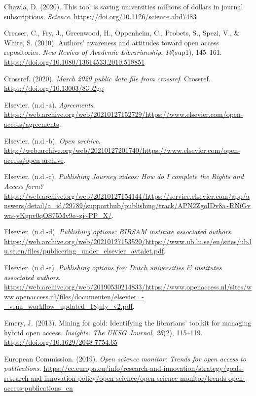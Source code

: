 \documentclass[a4paper,man,floatsintext,longtable,noextraspace,12pt]{apa6}
\newlength{\cslhangindent}
\newenvironment{cslreferences}%
  {\setlength{\parindent}{0pt}%
  \everypar{\setlength{\hangindent}{\cslhangindent}}\ignorespaces}%
  {\par}
\begin{document}
\begin{cslreferences}
\leavevmode\hypertarget{ref-Chawla_2020}{}%
Chawla, D. (2020). This tool is saving universities millions of dollars
in journal subscriptions. \emph{Science}.
\url{https://doi.org/10.1126/science.abd7483}

\leavevmode\hypertarget{ref-Creaser_2010}{}%
Creaser, C., Fry, J., Greenwood, H., Oppenheim, C., Probets, S., Spezi,
V., \& White, S. (2010). Authors' awareness and attitudes toward open
access repositories. \emph{New Review of Academic Librarianship},
\emph{16}(sup1), 145--161.
\url{https://doi.org/10.1080/13614533.2010.518851}

\leavevmode\hypertarget{ref-Crossref_2020}{}%
Crossref. (2020). \emph{March 2020 public data file from crossref}.
Crossref. \url{https://doi.org/10.13003/83b2gp}

\leavevmode\hypertarget{ref-Els_Agreements}{}%
Elsevier. (n.d.-a). \emph{Agreements}.
\url{https://web.archive.org/web/20210127152729/https://www.elsevier.com/open-access/agreements}.

\leavevmode\hypertarget{ref-Els_Archive}{}%
Elsevier. (n.d.-b). \emph{Open archive}.
\url{http://web.archive.org/web/20210127201740/https://www.elsevier.com/open-access/open-archive}.

\leavevmode\hypertarget{ref-Els_videos}{}%
Elsevier. (n.d.-c). \emph{Publishing Journey videos: How do I complete
the Rights and Access form?}
\url{https://web.archive.org/web/20210127154144/https://service.elsevier.com/app/answers/detail/a_id/29789/supporthub/publishing/track/APN2ZgoIDv8a~RNiGvwa~yKgpv0qOS75Mv9e~zj~PP_X/}.

\leavevmode\hypertarget{ref-lund}{}%
Elsevier. (n.d.-d). \emph{Publishing options: BIBSAM institute
associated authors}.
\url{https://web.archive.org/web/20210127153520/https://www.ub.lu.se/en/sites/ub.lu.se.en/files/publicering_under_elsevier_avtalet.pdf}.

\leavevmode\hypertarget{ref-vsnu}{}%
Elsevier. (n.d.-e). \emph{Publishing options for: Dutch universities \&
institutes associated authors}.
\url{https://web.archive.org/web/20190530214833/https://www.openaccess.nl/sites/www.openaccess.nl/files/documenten/elsevier_-_vsnu_workflow_updated_18july_v2.pdf}.

\leavevmode\hypertarget{ref-Emery_2013}{}%
Emery, J. (2013). Mining for gold: Identifying the librarians' toolkit
for managing hybrid open access. \emph{Insights: The UKSG Journal},
\emph{26}(2), 115--119. \url{https://doi.org/10.1629/2048-7754.65}

\leavevmode\hypertarget{ref-OS_Monitor}{}%
European Commission. (2019). \emph{Open science monitor: Trends for open
access to publications}.
\url{https://ec.europa.eu/info/research-and-innovation/strategy/goals-research-and-innovation-policy/open-science/open-science-monitor/trends-open-access-publications_en}


\end{cslreferences}
\end{document}
